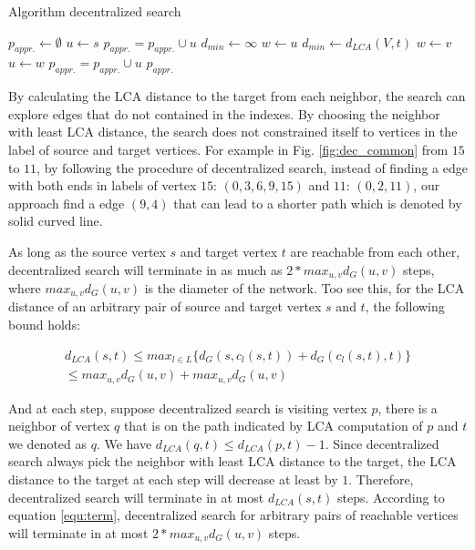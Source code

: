 \begin{algorithm}
    \caption{Algorithm decentralized search}
		\label{alg:dec}
    \begin{algorithmic}
					\State $p_{appr.} \gets \emptyset$
					\State $u \gets s$
					\State $p_{appr.} = p_{appr.} \cup u$
						\State $d_{min} \gets \infty$
						\State $w \gets u$
						\For{$each v adjecent to u$}
							\If{$d_{LCA}(v,t) < d_{min}$}
								\State $d_{min} \gets d_{LCA}(V,t)$
								\State $w \gets v$ 
							\EndIf
						\EndFor
						\State $u \gets w$
						\State $p_{appr.} = p_{appr.} \cup u$
					\EndWhile
					\State \Return $p_{appr.}$
        \EndFunction
    \end{algorithmic}
\end{algorithm}

By calculating the LCA distance to the target from each neighbor, the search can explore edges that do not contained in the indexes. By choosing the neighbor with least LCA distance, the search does not constrained itself to vertices in the label of source and target vertices. For example in Fig. \ref{fig:dec_common} from $15$ to $11$, by following the procedure of decentralized search, instead of finding a edge with both ends in labels of vertex $15$: $(0, 3, 6, 9, 15)$ and $11$: $(0, 2, 11)$, our approach find a edge $(9, 4)$ that can lead to a shorter path which is denoted by solid curved line. 

As long as the source vertex $s$ and target vertex $t$ are reachable from each other, decentralized search will terminate in as much as $2 * max_{u,v}d_G(u,v)$ steps, where $max_{u,v}d_G(u,v)$ is the diameter of the network. Too see this, for the LCA distance of an arbitrary pair of source and target vertex $s$ and $t$, the following bound holds:

\begin{equation}
\label{equ:term}
\begin{split}
    d_{LCA}(s,t) \leq max_{l \in L}\{d_G(s,c_l(s,t)) + d_G(c_l(s,t),t)\} \\
		\leq max_{u,v}d_G(u,v) + max_{u,v}d_G(u,v)
\end{split}
\end{equation}

And at each step, suppose decentralized search is visiting vertex $p$, there is a neighbor of vertex $q$ that is on the path indicated by LCA computation of $p$ and $t$ we denoted as $q$. We have $d_{LCA}(q,t) \leq d_{LCA}(p,t) - 1$. Since decentralized search always pick the neighbor with least LCA distance to the target, the LCA distance to the target at each step will decrease at least by $1$. Therefore, decentralized search will terminate in at most $d_{LCA}(s,t)$ steps. According to equation \ref{equ:term}, decentralized search for arbitrary pairs of reachable vertices will terminate in at most $2 * max_{u,v}d_G(u,v)$ steps.

